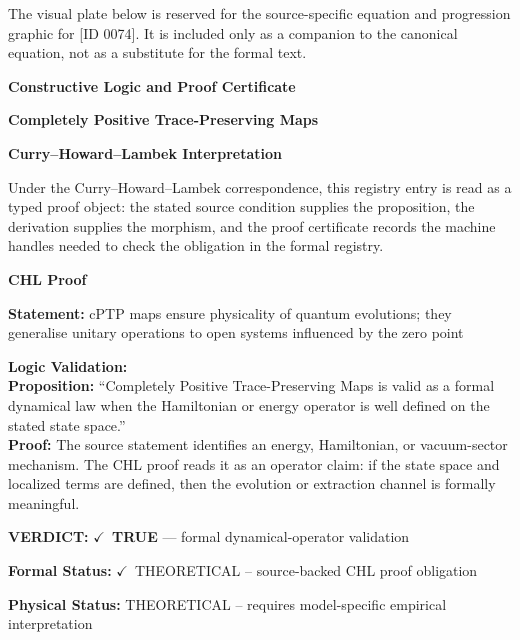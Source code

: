 \begingroup\footnotesize\sloppy
The visual plate below is reserved for the source-specific equation and progression graphic for [ID 0074]. It is included only as a companion to the canonical equation, not as a substitute for the formal text.
\par\endgroup
\ifTZPDarkEdition
{}
\fi

\clearpage
\begingroup\tzpsupportsetup
\noindent\textbf{\fontsize{10.8pt}{12.8pt}\selectfont [ID 0074] Constructive Logic and Proof Certificate}\par
\noindent\textbf{\fontsize{10pt}{12pt}\selectfont Completely Positive Trace-Preserving Maps}\par
\vspace{0.45em}
\begingroup
\footnotesize
\setlength{\parskip}{0.22em}
\setlength{\parindent}{0pt}
\noindent\textbf{Curry--Howard--Lambek Interpretation}\par
Under the Curry--Howard--Lambek correspondence, this registry entry is read as a typed proof
object: the stated source condition supplies the proposition, the derivation supplies the
morphism, and the proof certificate records the machine handles needed to check the obligation
in the formal registry.

\vspace{0.45em}
\noindent\textbf{CHL Proof}\par
\textbf{Statement:} cPTP maps ensure physicality of quantum evolutions; they generalise unitary operations
to open systems influenced by the zero point

\textbf{Logic Validation:}\\
\textbf{Proposition:} ``Completely Positive Trace-Preserving Maps is valid as a formal dynamical law when the
Hamiltonian or energy operator is well defined on the stated state space.''\\
\textbf{Proof:} The source statement identifies an energy, Hamiltonian, or vacuum-sector mechanism. The
CHL proof reads it as an operator claim: if the state space and localized terms are
defined, then the evolution or extraction channel is formally meaningful.

\textbf{VERDICT:} \ensuremath{\checkmark}\ \textbf{TRUE} --- formal dynamical-operator validation

\textbf{Formal Status:} \ensuremath{\checkmark}\ THEORETICAL -- source-backed CHL proof obligation

\textbf{Physical Status:} THEORETICAL -- requires model-specific empirical interpretation
\par\vspace{0.45em}
\par
\ifTZPDarkEdition
{}
\fi
\endgroup
\endgroup
